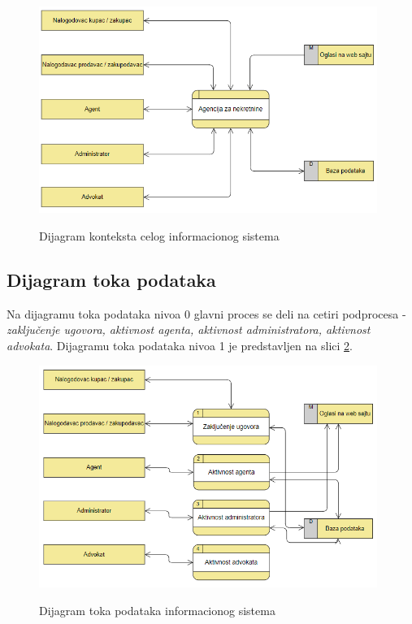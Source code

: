 \documentclass{article}
\begin{document}
\begin{figure}[h]
		\centering
		\includegraphics[width=0.98\textwidth,height=0.5\textheight]{Pictures/DijagramKontekstaCelogSistema}\\
		\caption{Dijagram konteksta celog informacionog sistema}
		\label{fig:dijagramKontekstaCelogIS}
	\end{figure}

\newpage
\subsection{\bfseries Dijagram toka podataka}

Na dijagramu toka podataka nivoa 0 glavni proces se deli na cetiri podprocesa - {\it zaključenje ugovora, aktivnost agenta, aktivnost administratora, aktivnost advokata}.
Dijagramu toka podataka nivoa 1 je predstavljen na slici \ref{fig:dijagramTokaPodatakaIS}. 

\begin{figure}[h]
		\centering
		\includegraphics[width=0.98\textwidth,height=0.5\textheight]{Pictures/DijagramTokaPodataka}\\
		\caption{Dijagram toka podataka informacionog sistema}
		\label{fig:dijagramTokaPodatakaIS}
	\end{figure}
\end{document}
